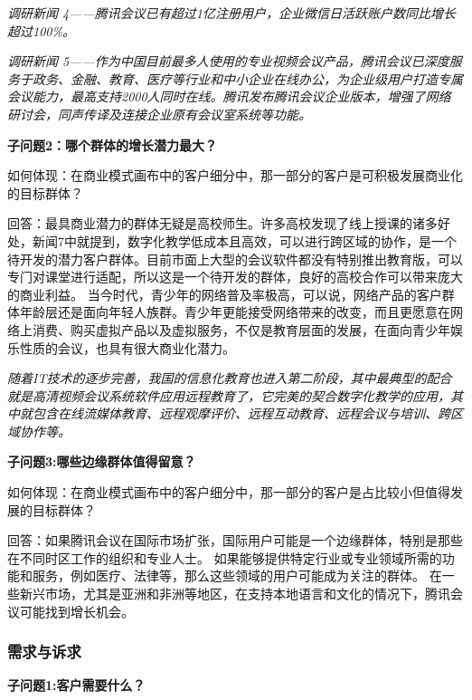 \documentclass[a4paper,12pt]{article}
\begin{document}
    \textit{调研新闻 4——腾讯会议已有超过1亿注册⽤户，企业微信⽇活跃账户数同⽐增⻓超过100\%。}


    \textit{调研新闻 5——作为中国⽬前最多⼈使⽤的专业视频会议产品，腾讯会议已深度服务于政务、⾦融、教育、医疗等⾏业和中⼩企业在线办公，为企业级⽤户打造专属会议能⼒，最⾼⽀持2000⼈同时在线。腾讯发布腾讯会议企业版本，增强了⽹络研讨会，同声传译及连接企业原有会议室系统等功能。}

    
    \textbf{子问题2：哪个群体的增长潜力最大？}

    如何体现：在商业模式画布中的客户细分中，那⼀部分的客户是可积极发展商业化的⽬标群体？

    回答：最具商业潜⼒的群体⽆疑是⾼校师⽣。许多⾼校发现了线上授课的诸多好处，新闻7中就提到，数字化教学低成本且⾼效，可以进⾏跨区域的协作，是⼀个待开发的潜⼒客户群体。⽬前市⾯上⼤型的会议软件都没有特别推出教育版，可以专⻔对课堂进⾏适配，所以这是⼀个待开发的群体，良好的⾼校合作可以带来庞⼤的商业利益。
    当今时代，青少年的网络普及率极高，可以说，⽹络产品的客户群体年龄层还是⾯向年轻⼈族群。⻘少年更能接受⽹络带来的改变，⽽且更愿意在⽹络上消费、购买虚拟产品以及虚拟服务，不仅是教育层面的发展，在面向青少年娱乐性质的会议，也具有很大商业化潜力。

    \textit{随着IT技术的逐步完善，我国的信息化教育也进⼊第⼆阶段，其中最典型的配合就是⾼清视频会议系统软件应⽤远程教育了，它完美的契合数字化教学的应⽤，其中就包含在线流媒体教育、远程观摩评价、远程互动教育、远程会议与培训、跨区域协作等。}


    \textbf{子问题3:哪些边缘群体值得留意？}

    如何体现：在商业模式画布中的客户细分中，那⼀部分的客户是占比较小但值得发展的⽬标群体？

    回答：如果腾讯会议在国际市场扩张，国际用户可能是一个边缘群体，特别是那些在不同时区工作的组织和专业人士。
    如果能够提供特定行业或专业领域所需的功能和服务，例如医疗、法律等，那么这些领域的用户可能成为关注的群体。
    在一些新兴市场，尤其是亚洲和非洲等地区，在支持本地语言和文化的情况下，腾讯会议可能找到增长机会。
    \subsubsection{需求与诉求}
    \textbf{子问题1:客户需要什么？}
\end{document}
